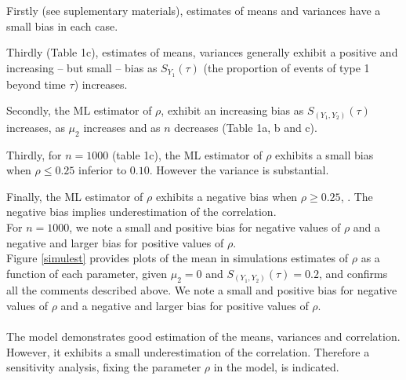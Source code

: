 \documentclass[twoside,a4paper,12pt]{article}
\renewcommand{\hat}{\widehat}
\theoremstyle{plain}
\theoremstyle{definition}
\begin{document}
Firstly (see suplementary materials), estimates of means and variances have a small  bias in each case.

Thirdly (Table 1c), estimates of means, variances  generally exhibit a  positive and increasing -- but small -- bias 
as $S_{Y_1}(\tau)$ (the proportion of events of type 1 beyond time $\tau$) increases.

Secondly, the ML estimator of $\rho$, exhibit an increasing  bias as $S_{(Y_1,Y_2)}(\tau)$  increases, as $\mu_2$ increases and as $n$ decreases  (Table 1a, b and c).

Thirdly, for $ n=1000$ (table 1c), the ML estimator of $\rho$ exhibits a small bias when $\rho\leq 0.25$ inferior to $0.10$. However the variance is substantial.  

Finally, the ML estimator of $\rho$ exhibits a negative bias when $\rho\geq 0.25$, . 
The negative bias implies underestimation of the correlation.\\  For $ n=1000$, we note a small and positive bias for negative values of $\rho$ and a negative 
and larger bias for positive values of $\rho$.\\


Figure \ref{simulest} provides plots of the mean in simulations estimates of 
$\rho$ as a function of each parameter, given $\mu_{2}=0$ and 
$S_{(Y_1,Y_2)}(\tau)=0.2$, and confirms all the comments described above. 
We note a small and positive bias for negative values of $\rho$ and a negative 
and larger bias for positive values of $\rho$.\\
\\

The model demonstrates good estimation of the means, variances and correlation. 
However, it exhibits a small underestimation of the correlation. 
Therefore a sensitivity analysis, fixing the parameter $\rho$ in the model, is 
indicated. 
\end{document}
